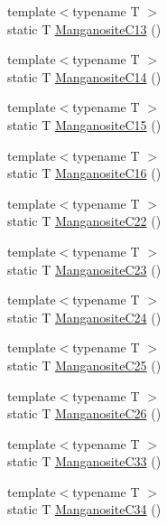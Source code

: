 \begin{DoxyCompactItemize}
\item 
{\footnotesize template$<$typename T $>$ }\\static T \mbox{\hyperlink{namespacempc_1_1data_ae6d7f63dc4c19c2a9f3cefd08cb2caa4}{Manganosite\+C13}} ()
\item 
{\footnotesize template$<$typename T $>$ }\\static T \mbox{\hyperlink{namespacempc_1_1data_af2eeaca48ce62f2dc7f7b2c072d9c17a}{Manganosite\+C14}} ()
\item 
{\footnotesize template$<$typename T $>$ }\\static T \mbox{\hyperlink{namespacempc_1_1data_a6e0b9baae5494f7b6b742f7cd1279638}{Manganosite\+C15}} ()
\item 
{\footnotesize template$<$typename T $>$ }\\static T \mbox{\hyperlink{namespacempc_1_1data_a89b845b12ea4ab0e93bad4527d228472}{Manganosite\+C16}} ()
\item 
{\footnotesize template$<$typename T $>$ }\\static T \mbox{\hyperlink{namespacempc_1_1data_a0f742efd9f01b8ec83dd1380c7dee8b2}{Manganosite\+C22}} ()
\item 
{\footnotesize template$<$typename T $>$ }\\static T \mbox{\hyperlink{namespacempc_1_1data_a4c875096453672d78f518aca2fd645fa}{Manganosite\+C23}} ()
\item 
{\footnotesize template$<$typename T $>$ }\\static T \mbox{\hyperlink{namespacempc_1_1data_a7dd40cb8fa698cc74ce130edf0cc633c}{Manganosite\+C24}} ()
\item 
{\footnotesize template$<$typename T $>$ }\\static T \mbox{\hyperlink{namespacempc_1_1data_adb94b41d0fafee68664168398ae55d15}{Manganosite\+C25}} ()
\item 
{\footnotesize template$<$typename T $>$ }\\static T \mbox{\hyperlink{namespacempc_1_1data_a47184401119087dae6461d40bb5f69d1}{Manganosite\+C26}} ()
\item 
{\footnotesize template$<$typename T $>$ }\\static T \mbox{\hyperlink{namespacempc_1_1data_ac8f599743cf35d4b07de390e0d6007fa}{Manganosite\+C33}} ()
\item 
{\footnotesize template$<$typename T $>$ }\\static T \mbox{\hyperlink{namespacempc_1_1data_af1609df984183ea6236ee3094e65ae46}{Manganosite\+C34}} ()
\item 

\end{DoxyCompactItemize}
